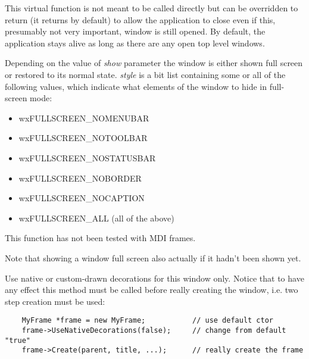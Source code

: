 
This virtual function is not meant to be called directly but can be overridden
to return \false (it returns \true by default) to allow the application to
close even if this, presumably not very important, window is still opened.
By default, the application stays alive as long as there are any open top level
windows.


\label{wxtoplevelwindowshowfullscreen}


Depending on the value of {\it show} parameter the window is either shown full
screen or restored to its normal state. {\it style} is a bit list containing
some or all of the following values, which indicate what elements of the window
to hide in full-screen mode:

\begin{itemize}\itemsep=0pt
\item wxFULLSCREEN\_NOMENUBAR
\item wxFULLSCREEN\_NOTOOLBAR
\item wxFULLSCREEN\_NOSTATUSBAR
\item wxFULLSCREEN\_NOBORDER
\item wxFULLSCREEN\_NOCAPTION
\item wxFULLSCREEN\_ALL (all of the above)
\end{itemize}

This function has not been tested with MDI frames.

Note that showing a window full screen also actually
 if it hadn't been shown yet.




\label{wxtoplevelwindowusenativedecorations}



Use native or custom-drawn decorations for this window only. Notice that to
have any effect this method must be called before really creating the window,
i.e. two step creation must be used:
\begin{verbatim}
    MyFrame *frame = new MyFrame;           // use default ctor
    frame->UseNativeDecorations(false);     // change from default "true"
    frame->Create(parent, title, ...);      // really create the frame
\end{verbatim}

